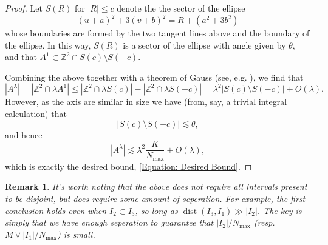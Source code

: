 \documentclass[12pt, letterpaper]{amsart}
\newtheorem{remark}{Remark}
\begin{document}
\begin{proof}
    Let $S(R)$ for $|R| \leq c$ denote the the sector of the ellipse 
    \[
    (u+a)^2+3(v+b)^2= R +\left(a^2 + 3b^2\right)
    \]
    whose boundaries are formed by the two tangent lines above and the boundary of the ellipse. In this way, $S(R)$ is a sector of the ellipse with angle given by $\theta$, and that $A^1\subset\mathbb{Z}^2\cap S(c)\setminus S(-c)$.

    Combining the above together with a theorem of Gauss (see, e.g. \cite{MR1945283}), we find that
    \[
    |A^\lambda|= |\mathbb{Z}^2\cap \lambda A^1|\leq |\mathbb{Z}^2\cap \lambda S(c)| - |\mathbb{Z}^2\cap\lambda S(-c)| = \lambda^2 |S(c)\setminus S(-c)| + O(\lambda).
    \]
    However, as the axis are similar in size we have (from, say, a trivial integral calculation) that 
    \[
    |S(c)\setminus S(-c)|\lesssim \theta,
    \]
    and hence
    \[
|A^\lambda|\lesssim \lambda^2\frac{K}{N_{\max}}+O(\lambda),
    \]
    which is exactly the desired bound, \eqref{Equation: Desired Bound}.
\end{proof}
\begin{remark}
    It's worth noting that the above does not require all intervals present to be disjoint, but does require some amount of seperation. For example, the first conclusion holds even when $I_2\subset I_3$, so long as $\operatorname{dist}(I_3, I_1)\gg |I_2|$. The key is simply that we have enough seperation to guarantee that $|I_2|/N_{\max}$ (resp. $M\vee |I_1|/N_{\max}$) is small.
\end{remark}
\end{document}

